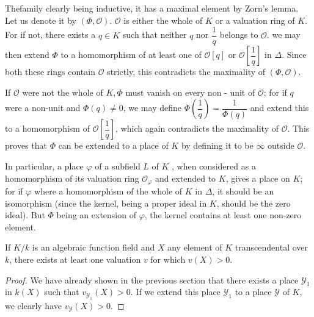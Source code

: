The\pageoriginale family clearly being inductive, it has a maximal element by Zorn's
lemma. Let us denote it by $(\Phi, \mathscr{O})$. $\mathscr{O}$ is
either the whole of $K$ or a valuation ring of $K$. For if not, there
exists a $q \in K$ such that neither $q$ nor $\dfrac{1}{q}$ belongs to
$\mathscr{O}$. we may then extend $\Phi$ to a homomorphism of at least
one of $\mathscr{O}[q]$ or $\mathscr{O}\left[\dfrac{1}{q}\right]$ in
$\Delta$. Since both these rings contain $\mathscr{O}$ strictly, this
contradicts the maximality of $(\Phi , \mathscr{O})$. 

If $\mathscr{O}$ were not the whole of $K, \Phi$ must vanish on every
non - unit of $\mathscr{O}$; for if $q$ were a non-unit and $\Phi(q)
\neq 0$, we may define $\Phi \left(\dfrac{1}{q}\right) = \dfrac{1}{\Phi (q)}$ and
extend this to a homomorphism of $\mathscr{O} \left[\dfrac{1}{q}\right]$, which
again contradicts the maximality of $\mathscr{O}$. This proves that
$\Phi	$ can be extended to a place of $K$ by defining it to be
$\infty$ outside $\mathscr{O}$. 

In particular, a place $\varphi$ of a subfield $L$ of $K$ , when
considered as a homomorphism of its valuation ring
$\mathscr{O}_{\varphi}$ and extended to $K$, gives a place on $K$; for
if $\varphi$ where a homomorphism of the whole of $K$ in $\Delta$, it
should be an isomorphism (since the kernel, being a proper ideal in
$K$, should be the zero ideal). But $\Phi$ being an extension of
$\varphi$, the kernel contains at least one non-zero element. 

\begin{coro*}
  If $K/k$ is an algebraic function field and $X$ any element of $K$
  transcendental over $k$, there exists at least one valuation $v$ for
  which $v(X) > 0$. 
\end{coro*}

\begin{proof}
  We have already shown in the previous section that there exists a
  place $\mathscr{Y}_1$ in $k(X)$ such that $v_{\mathscr{Y}_1}(X) > 0$. If we extend
  this place $\mathscr{Y}_1$ to a place $\mathscr{Y}$ of $K$, we
  clearly have $v_{\mathscr{Y}}(X) > 0$. 
\end{proof}
